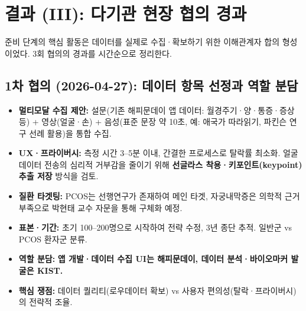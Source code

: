 \documentclass[11pt,a4paper]{article}
\begin{document}
\section{결과 (III): 다기관 현장 협의 경과}
준비 단계의 핵심 활동은 데이터를 실제로 수집·확보하기 위한 이해관계자 합의 형성이었다. 3회 협의의 경과를 시간순으로 정리한다.

\subsection{1차 협의 (2026-04-27): 데이터 항목 선정과 역할 분담}
\begin{itemize}
  \item \textbf{멀티모달 수집 제안:} 설문(기존 해피문데이 앱 데이터: 월경주기·양·통증·증상 등) + 영상(얼굴·손) + 음성(표준 문장 약 10초, 예: 애국가 따라읽기, 파킨슨 연구 선례 활용)을 통합 수집.
  \item \textbf{UX·프라이버시:} 측정 시간 3{--}5분 이내, 간결한 프로세스로 탈락률 최소화. 얼굴 데이터 전송의 심리적 거부감을 줄이기 위해 \textbf{선글라스 착용·키포인트(keypoint) 추출 저장} 방식을 검토.
  \item \textbf{질환 타겟팅:} PCOS는 선행연구가 존재하여 메인 타겟, 자궁내막증은 의학적 근거 부족으로 박현태 교수 자문을 통해 구체화 예정.
  \item \textbf{표본·기간:} 초기 100{--}200명으로 시작하여 전략 수정, 3년 종단 추적. 일반군 vs PCOS 환자군 분류.
  \item \textbf{역할 분담:} \textbf{앱 개발·데이터 수집 UI는 해피문데이, 데이터 분석·바이오마커 발굴은 KIST.}
  \item \textbf{핵심 쟁점:} 데이터 퀄리티(로우데이터 확보) vs 사용자 편의성(탈락·프라이버시)의 전략적 조율.
\end{itemize}
\end{document}
